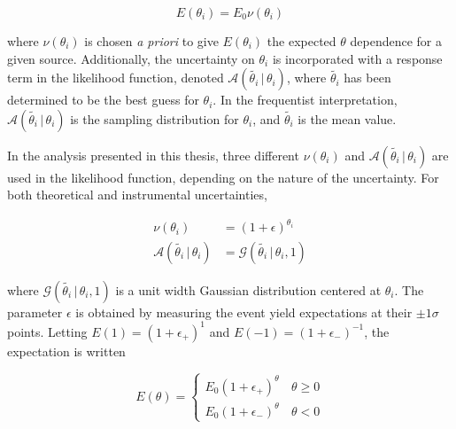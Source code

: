 \begin{equation}
E(\theta_i) = E_0\nu(\theta_i)
\end{equation}

\noindent
where $\nu(\theta_i)$ is chosen {\it a priori} to give $E(\theta_i)$ the
expected $\theta$ dependence for a given source. Additionally, the
uncertainty on $\theta_i$ is incorporated with a response term in the
likelihood function, denoted
$\mathscr{A}(\tilde{\theta_i}\,|\,\theta_i)$, where $\tilde{\theta_i}$ has
been determined to be the best guess for $\theta_i$. In the
frequentist interpretation, $\mathscr{A}(\tilde{\theta_i}\,|\,\theta_i)$
is the sampling distribution for $\theta_i$, and $\tilde{\theta_i}$
is the mean value. 

In the analysis presented in this thesis, three different
$\nu(\theta_i)$ and $\mathscr{A}(\tilde{\theta_i}\,|\,\theta_i)$ are used
in the likelihood function, depending on the
nature of the uncertainty. For both theoretical and instrumental
uncertainties, 

\begin{equation}
\begin{aligned}
\nu(\theta_i) &= (1+\epsilon)^{\theta_i} \\
\mathscr{A}(\tilde{\theta_i}\,|\,\theta_i)
&= \mathcal{G}(\tilde{\theta_i}\,|\,\theta_i,1)
\label{chapter:statistics:equation:nu_theta_A_theta}
\end{aligned}
\end{equation}

\noindent
where $\mathcal{G}(\tilde{\theta_i}\,|\,\theta_i,1)$ is a unit width Gaussian distribution
centered at $\theta_i$. The parameter $\epsilon$ is obtained by
measuring the event yield expectations at their $\pm 1\sigma$
points. Letting $E(1) = (1+\epsilon_{+})^{1}$ and $E(-1) =
(1+\epsilon_{-})^{-1}$, the expectation is written

\begin{equation}
E(\theta) = \left\{
\begin{array}{ll} 
E_0(1+\epsilon_+)^{\theta} & \, \theta\geq 0 \\
E_0(1+\epsilon_-)^{\theta} & \, \theta < 0
\end{array}
\right.
\label{chapter:statistics:equation:E_theta}
\end{equation}


